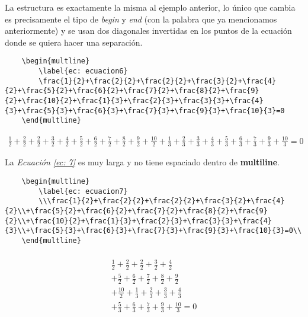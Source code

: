 La estructura es exactamente la misma al ejemplo anterior, lo único que cambia es precisamente el tipo de \textit{begin} y \textit{end} (con la palabra que ya mencionamos anteriormente) y se usan dos diagonales invertidas en los puntos de la ecuación donde se quiera hacer una separación.
\begin{lstlisting}
    \begin{multline}
        \label{ec: ecuacion6}
        \frac{1}{2}+\frac{2}{2}+\frac{2}{2}+\frac{3}{2}+\frac{4}{2}+\frac{5}{2}+\frac{6}{2}+\frac{7}{2}+\frac{8}{2}+\frac{9}{2}+\frac{10}{2}+\frac{1}{3}+\frac{2}{3}+\frac{3}{3}+\frac{4}{3}+\frac{5}{3}+\frac{6}{3}+\frac{7}{3}+\frac{9}{3}+\frac{10}{3}=0
    \end{multline}
\end{lstlisting}
\begin{multline}
        \label{ec: 7}
        \frac{1}{2}+\frac{2}{2}+\frac{2}{2}+\frac{3}{2}+\frac{4}{2}+\frac{5}{2}+\frac{6}{2}+\frac{7}{2}+\frac{8}{2}+\frac{9}{2}+\frac{10}{2}+\frac{1}{3}+\frac{2}{3}+\frac{3}{3}+\frac{4}{3}+\frac{5}{3}+\frac{6}{3}+\frac{7}{3}+\frac{9}{3}+\frac{10}{3}=0
\end{multline}

La \textit{Ecuación \ref{ec: 7}} es muy larga y no tiene espaciado dentro de \textbf{multiline}.
\begin{lstlisting}
    \begin{multline}
        \label{ec: ecuacion7}
        \\\frac{1}{2}+\frac{2}{2}+\frac{2}{2}+\frac{3}{2}+\frac{4}{2}\\+\frac{5}{2}+\frac{6}{2}+\frac{7}{2}+\frac{8}{2}+\frac{9}{2}\\+\frac{10}{2}+\frac{1}{3}+\frac{2}{3}+\frac{3}{3}+\frac{4}{3}\\+\frac{5}{3}+\frac{6}{3}+\frac{7}{3}+\frac{9}{3}+\frac{10}{3}=0\\
    \end{multline}
\end{lstlisting}
\begin{multline}
    \label{ec: 8}
    \\
    \frac{1}{2}+\frac{2}{2}+\frac{2}{2}+\frac{3}{2}+\frac{4}{2} \\
    +\frac{5}{2}+\frac{6}{2}+\frac{7}{2}+\frac{8}{2}+\frac{9}{2} \\
    +\frac{10}{2}+\frac{1}{3}+\frac{2}{3}+\frac{3}{3}+\frac{4}{3} \\
    +\frac{5}{3}+\frac{6}{3}+\frac{7}{3}+\frac{9}{3}+\frac{10}{3}=0 \\
\end{multline}

